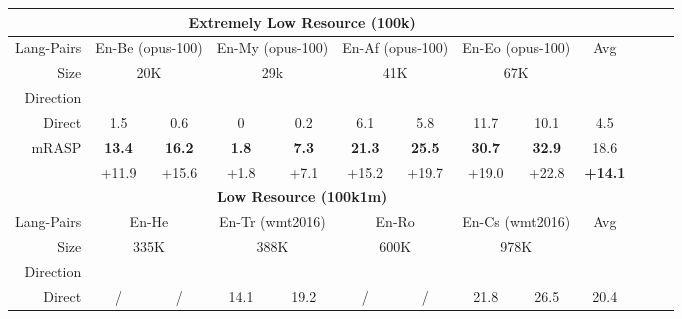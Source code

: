 \documentclass[11pt,a4paper]{article}
\newcommand{\mf}[1]{\multicolumn{2}{c}{ #1}}
\newcommand{\smf}[1]{\multicolumn{2}{c}{#1}}
\newcommand{\method}{mRASP\xspace}
\newcommand{\baseline}{Direct}
\begin{document}
\begin{table*}[htb]
\begin{center}
\begin{tabular}{rcccccccccccc}
\toprule
&\multicolumn{7}{c}{\textbf{Extremely Low Resource (100k)}} \\
\midrule

Lang-Pairs& 
\mf{En-Be (opus-100)} &
\mf{En-My (opus-100)} &
\mf{En-Af (opus-100)} &
\mf{En-Eo (opus-100)} & 
Avg

\\



Size &
\smf{20K}  & 
\smf{29k}  & 
\smf{41K} & 
\smf{67K} & 

\\


Direction & 
  & &

  & &

  & &

  & \\




\midrule
\baseline &
1.5 & 0.6 & 0 & 0.2 &  6.1 & 5.8 & 11.7 & 10.1 & 4.5
\\


 \method &
\bf 13.4 & \bf 16.2 &
\bf 1.8 & \bf 7.3 &
\bf 21.3 & \bf 25.5 &
\bf 30.7 & \bf 32.9 &
18.6

\\

  &
 +11.9 & +15.6 &
 +1.8 & +7.1  &
 +15.2 & +19.7 &
 +19.0 & +22.8 &
 \textbf{+14.1}

\\

\midrule
\midrule

&\multicolumn{7}{c}{\textbf{Low Resource (100k1m)}} \\
\midrule


Lang-Pairs &
\mf{En-He} &
\mf{En-Tr (wmt2016)} &
\mf{En-Ro} &
\mf{En-Cs (wmt2016)} &
Avg
\\


Size &
\smf{335K} & 
\smf{388K} & 
\smf{600K} & 
\smf{978K}
\\


 Direction & 
  & &

  & &

  & &

  & \\




\midrule
 \baseline &
/ & / & 14.1 & 19.2 & / & / & 21.8 & 26.5 & 20.4
\\



\end{tabular}
\end{center}
\end{table*}
\end{document}
